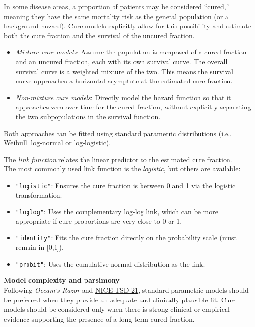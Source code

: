 \documentclass[
]{article}
\providecommand{\tightlist}{%
  \setlength{\itemsep}{0pt}\setlength{\parskip}{0pt}}
\begin{document}
In some disease areas, a proportion of patients may be considered
``cured,'' meaning they have the same mortality risk as the general
population (or a background hazard). Cure models explicitly allow for
this possibility and estimate both the cure fraction and the survival of
the uncured fraction.

\begin{itemize}
\tightlist
\item
  \emph{Mixture cure models}: Assume the population is composed of a
  cured fraction and an uncured fraction, each with its own survival
  curve. The overall survival curve is a weighted mixture of the two.
  This means the survival curve approaches a horizontal asymptote at the
  estimated cure fraction.\\
\item
  \emph{Non-mixture cure models}: Directly model the hazard function so
  that it approaches zero over time for the cured fraction, without
  explicitly separating the two subpopulations in the survival function.
\end{itemize}

Both approaches can be fitted using standard parametric distributions
(i.e., Weibull, log-normal or log-logistic).

The \emph{link function} relates the linear predictor to the estimated
cure fraction.\\
The most commonly used link function is the \emph{logistic}, but others
are available:

\begin{itemize}
\tightlist
\item
  \texttt{"logistic"}: Ensures the cure fraction is between 0 and 1 via
  the logistic transformation.\\
\item
  \texttt{"loglog"}: Uses the complementary log-log link, which can be
  more appropriate if cure proportions are very close to 0 or 1.\\
\item
  \texttt{"identity"}: Fits the cure fraction directly on the
  probability scale (must remain in {[}0,1{]}).\\
\item
  \texttt{"probit"}: Uses the cumulative normal distribution as the
  link.
\end{itemize}

\textbf{Model complexity and parsimony}\\
Following \emph{Occam's Razor} and
\href{https://www.sheffield.ac.uk/media/34188/download?attachment}{NICE
TSD 21}, standard parametric models should be preferred when they
provide an adequate and clinically plausible fit. Cure models should be
considered only when there is strong clinical or empirical evidence
supporting the presence of a long-term cured fraction.
\end{document}
